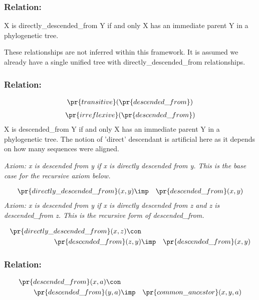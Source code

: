 \subsubsection{Relation:  }


X is directly\_descended\_from
Y if and only X has an immediate parent Y in a phylogenetic
tree.

These relationships are not inferred
within this framework. It is assumed we already have a single unified
tree with directly\_descended\_from relationships.

\subsubsection{Relation:  }


\begin{eqnarray*}
 \pr{transitive}( \pr{descended\_from}) 
\end{eqnarray*}
\begin{eqnarray*}
 \pr{irreflexive}( \pr{descended\_from}) 
\end{eqnarray*}
X is descended\_from Y if and only 
X has an immediate parent Y in a phylogenetic tree. The notion of
'direct' descendant is artificial here as it depends on how many
sequences were aligned.

\emph{Axiom: x is descended from y if x is directly descended from y. This is the base case for the recursive axiom below.}

\begin{eqnarray*}
 \pr{directly\_descended\_from}(x, y) &\imp & \pr{descended\_from}(x, y) 
\end{eqnarray*}
\emph{Axiom: x is descended from y if x is directly descended from z and z is descended\_from z. This is the recursive form of descended\_from.}

\begin{eqnarray*}
 \pr{directly\_descended\_from}(x, z) \con \\
 \pr{descended\_from}(z, y) &\imp & \pr{descended\_from}(x, y) 
\end{eqnarray*}
\subsubsection{Relation:  }


\begin{eqnarray*}
 \pr{descended\_from}(x, a) \con \\
 \pr{descended\_from}(y, a) &\imp & \pr{common\_ancestor}(x, y, a) 
\end{eqnarray*}
